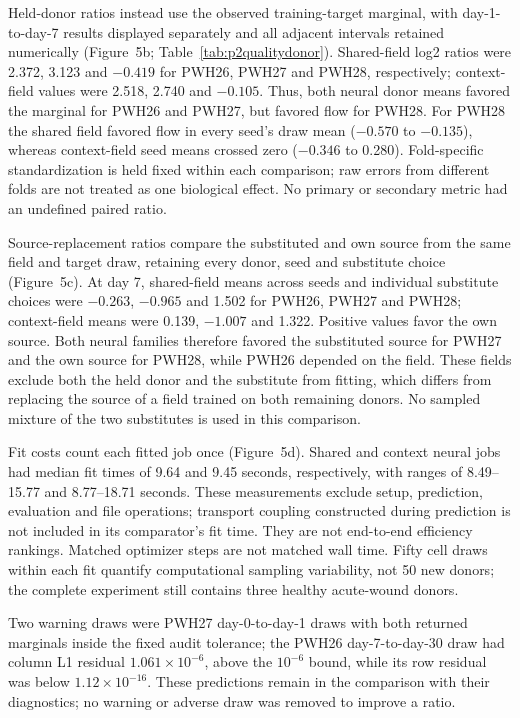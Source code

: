 \documentclass[10pt,a4paper]{article}
\begin{document}
Held-donor ratios instead use the observed training-target marginal, with day-1-to-day-7 results displayed separately and all adjacent intervals retained numerically (Figure~5b; Table~\ref{tab:p2qualitydonor}). Shared-field log2 ratios were 2.372, 3.123 and $-0.419$ for PWH26, PWH27 and PWH28, respectively; context-field values were 2.518, 2.740 and $-0.105$. Thus, both neural donor means favored the marginal for PWH26 and PWH27, but favored flow for PWH28. For PWH28 the shared field favored flow in every seed's draw mean ($-0.570$ to $-0.135$), whereas context-field seed means crossed zero ($-0.346$ to 0.280). Fold-specific standardization is held fixed within each comparison; raw errors from different folds are not treated as one biological effect. No primary or secondary metric had an undefined paired ratio.




Source-replacement ratios compare the substituted and own source from the same field and target draw, retaining every donor, seed and substitute choice (Figure~5c). At day 7, shared-field means across seeds and individual substitute choices were $-0.263$, $-0.965$ and 1.502 for PWH26, PWH27 and PWH28; context-field means were 0.139, $-1.007$ and 1.322. Positive values favor the own source. Both neural families therefore favored the substituted source for PWH27 and the own source for PWH28, while PWH26 depended on the field. These fields exclude both the held donor and the substitute from fitting, which differs from replacing the source of a field trained on both remaining donors. No sampled mixture of the two substitutes is used in this comparison.

Fit costs count each fitted job once (Figure~5d). Shared and context neural jobs had median fit times of 9.64 and 9.45 seconds, respectively, with ranges of 8.49--15.77 and 8.77--18.71 seconds. These measurements exclude setup, prediction, evaluation and file operations; transport coupling constructed during prediction is not included in its comparator's fit time. They are not end-to-end efficiency rankings. Matched optimizer steps are not matched wall time. Fifty cell draws within each fit quantify computational sampling variability, not 50 new donors; the complete experiment still contains three healthy acute-wound donors.

Two warning draws were PWH27 day-0-to-day-1 draws with both returned marginals inside the fixed audit tolerance; the PWH26 day-7-to-day-30 draw had column L1 residual $1.061\times10^{-6}$, above the $10^{-6}$ bound, while its row residual was below $1.12\times10^{-16}$. These predictions remain in the comparison with their diagnostics; no warning or adverse draw was removed to improve a ratio.
\end{document}
